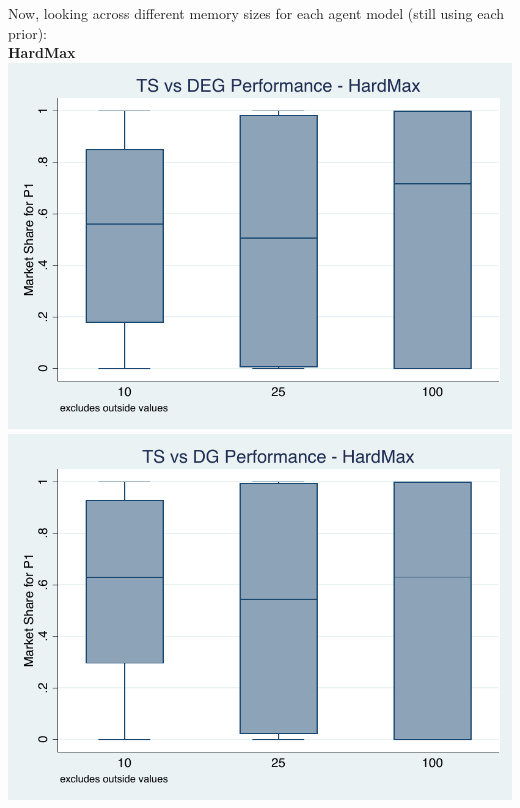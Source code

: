 \documentclass[11pt,letterpaper]{article}
\begin{document}
Now, looking across different memory sizes for each agent model (still using each prior): \\
\textbf{HardMax} \\
\includegraphics[scale=1]{hm_ts_deg} \\
\includegraphics[scale=1]{hm_ts_dg}
\end{document}
